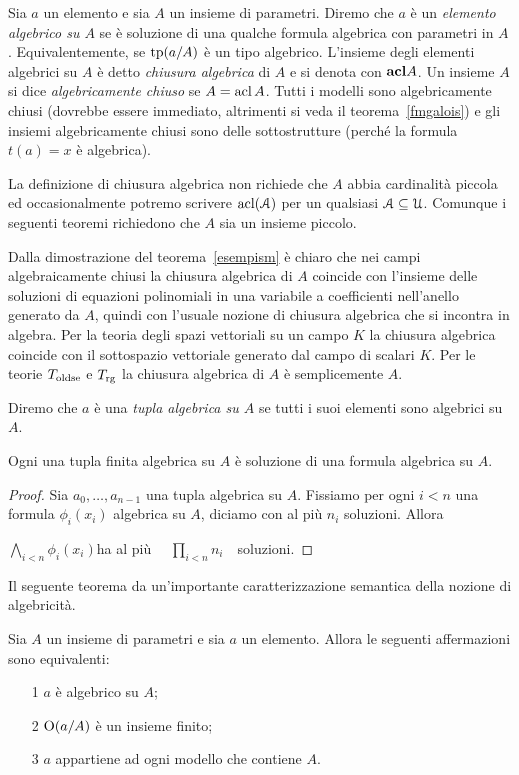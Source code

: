 Sia $a$ un elemento e sia $A$ un insieme di parametri. Diremo che $a$ \`e un \emph{elemento algebrico su $A$\/} se \`e soluzione di una qualche formula algebrica con parametri in $A$. Equivalentemente, se $\textrm{tp}(a/A)$ \`e un tipo algebrico. L'insieme degli elementi algebrici su $A$ \`e detto \emph{chiusura algebrica\/} di $A$ e si denota con \emph{${\rm\bf acl} A$}. Un insieme $A$ si dice \emph{algebricamente chiuso\/} se $A=\mathop{\rm acl} A$. Tutti i modelli sono algebricamente chiusi (dovrebbe essere immediato, altrimenti si veda il teorema~\ref{fmgalois}) e gli insiemi algebricamente chiusi sono delle sottostrutture (perch\'e la formula $t(a)=x$ \`e algebrica).

La definizione di chiusura algebrica non richiede che $A$ abbia cardinalit\`a piccola ed occasionalmente potremo scrivere $\mathop{\rm acl}(\EuScript A)$ per un qualsiasi $\EuScript A\subseteq\EuScript U$. Comunque i seguenti teoremi richiedono che $A$ sia un insieme piccolo.

Dalla dimostrazione del teorema~\ref{esempism} \`e chiaro che nei campi algebraicamente chiusi la chiusura algebrica di $A$ coincide con l'insieme delle soluzioni di equazioni polinomiali in una variabile a coefficienti nell'anello generato da $A$, quindi con l'usuale nozione di chiusura algebrica che si incontra in algebra. Per la teoria degli spazi vettoriali su un campo $K$ la chiusura algebrica coincide con il sottospazio vettoriale generato dal campo di scalari $K$. Per le teorie $T_{\rm oldse}$ e $T_{\rm rg}$ la chiusura algebrica di $A$ \`e semplicemente $A$.

Diremo che $a$ \`e una \emph{tupla algebrica su $A$\/} se tutti i suoi elementi sono algebrici su $A$.

\begin{lemma}
Ogni una tupla finita algebrica su $A$ \`e soluzione di una formula algebrica su $A$.
\end{lemma}
\begin{proof}
Sia $a_0,\dots,a_{n-1}$ una tupla algebrica su $A$. Fissiamo per ogni $i<n$ una formula $\phi_i(x_i)$ algebrica su $A$, diciamo con al pi\`u $n_i$ soluzioni. Allora

\hfill $\displaystyle\bigwedge_{i<n}\phi_i(x_i)$\hfill ha al pi\`u \ \  $\displaystyle\prod_{i<n}n_i$\ \ soluzioni.
\end{proof}

Il seguente teorema da un'importante caratterizzazione semantica della nozione di algebricit\`a.

\begin{theorem}\label{fmgalois}
Sia $A$ un insieme di parametri e sia $a$ un elemento. Allora le seguenti affermazioni sono equivalenti:
\begin{itemize}
\item[1] $a$ \`e algebrico su $A$;
\item[2] $\textrm{O}(a/A)$ \`e un insieme finito;
\item[3] $a$ appartiene ad ogni modello che contiene $A$.
\end{itemize}
\end{theorem}

